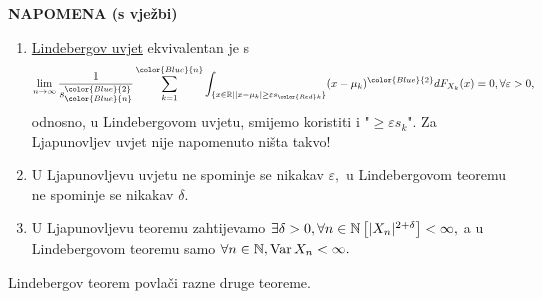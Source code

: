 \documentclass{article}
\newcommand{\Var}{\operatorname{Var}}
\begin{document}
\textbf{NAPOMENA (s vježbi)}\begin{enumerate}
    \item[\ding{113}] \underline{Lindebergov uvjet} ekvivalentan je s \[\lim_{n\to\infty}\frac1{s_{{\color{Blue}{n}}}^{\color{Blue}{2}}}\sum_{k=1}^{{\color{Blue}{n}}}\int_{\{x\in\Bbb R\mid |x-\mu_k|\ge\varepsilon s_{\color{Red}k}\}}(x-\mu_k)^{\color{Blue}{2}}dF_{X_k}(x)=0,\forall\varepsilon>0,\] odnosno, u Lindebergovom uvjetu, smijemo koristiti i "\(\ge\varepsilon s_k\)". Za Ljapunovljev uvjet nije napomenuto ništa takvo!
    \item[\ding{113}] U Ljapunovljevu uvjetu ne spominje se nikakav \(\varepsilon,\) u Lindebergovom teoremu ne spominje se nikakav \(\delta.\)
    \item[\ding{113}] U Ljapunovljevu teoremu zahtijevamo \(\exists\delta>0,\forall n\in\Bbb N\left[|X_n|^{2+\delta}\right]<\infty,\) a u Lindebergovom teoremu samo \(\forall n\in\Bbb  N,\Var X_n<\infty.\)
\end{enumerate}
Lindebergov teorem povlači razne druge teoreme.
\end{document}
